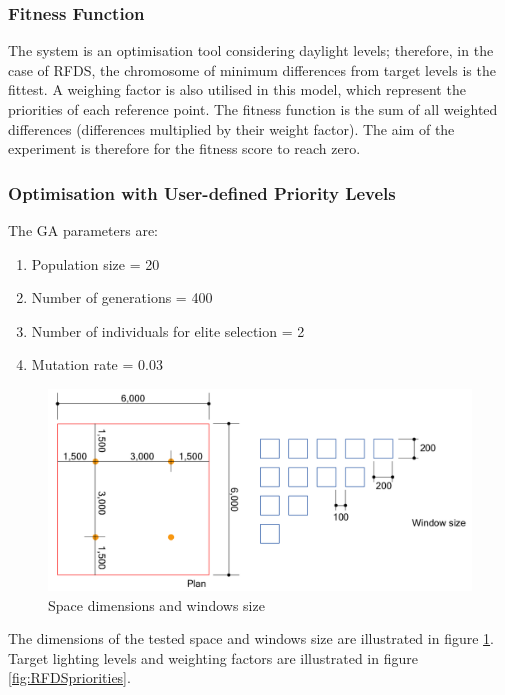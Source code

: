 \subsubsection{Fitness Function}

The system is an optimisation tool considering daylight levels; therefore, in the case of RFDS, the chromosome of minimum differences from target levels is the fittest. A weighing factor is also utilised in this model, which represent the priorities of each reference point. The fitness function is the sum of all weighted differences (differences multiplied by their weight factor). The aim of the experiment is therefore for the fitness score to reach zero.

\subsubsection{Optimisation with User-defined Priority Levels}

The GA parameters are:
\begin{enumerate}[nolistsep]
\item Population size = 20 
\item Number of generations = 400
\item Number of individuals for elite selection = 2
\item Mutation rate = 0.03
\end{enumerate}

\begin{figure}[htbp]
\centering
\includegraphics[width=\textwidth]{./Images/27-RFDSimplement}
\caption[RFDS Space Dimensions and Window Size]{Space dimensions and windows size \cite{kawakita01}}
\label{fig:RFDSimplement}
\end{figure}

The dimensions of the tested space and windows size are illustrated in figure \ref{fig:RFDSimplement}. Target lighting levels and weighting factors are illustrated in figure \ref{fig:RFDSpriorities}.

